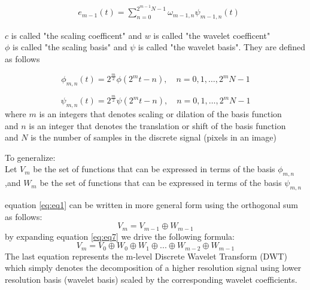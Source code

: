 \documentclass{svproc}
\begin{document}
  \begin{equation}
    \begin{aligned}
       & e_{m-1}(t)=\sum_{n=0}^{2^{m-1} N-1} \omega_{{m-1}, n} \psi_{{m-1}, n}(t)
    \end{aligned}
    \label{eq:eq4}
  \end{equation}

  \noindent
  $c$ is called "the scaling coefficent" and $w$ is called "the wavelet coefficent"\\
  $\phi$ is called "the scaling basis" and $\psi$ is called "the wavelet basis". They are defined as follows

  \begin{equation}
    \phi_{m, n}(t)=2^{\frac{m}{2}} \phi\left(2^m t-n\right), \quad n=0,1, \ldots, 2^m N-1
    \label{eq:eq5}
    \end{equation}

    \begin{equation}
      \psi_{m, n}(t)=2^{\frac{m}{2}} \psi\left(2^m t-n\right), \quad n=0,1, \ldots, 2^m N-1
      \label{eq:eq6}
      \end{equation}
  where $m$ is an integers that denotes scaling or dilation of the basis function\\
  and $n$ is an integer that denotes the translation or shift of the basis function\\
  and $N$ is the number of samples in the discrete signal (pixels in an image)

  \noindent
To generalize:\\ 
Let $V_m$ be the set of functions that can be expressed in terms of the basis $\phi_{m,n}$\\
,and $W_m$ be the set of functions that can be expressed in terms of the basis $\psi_{m,n}$

\noindent
equation \ref{eq:eq1} can be written in more general form using the orthogonal sum as follows:\\
\begin{equation}
  V_m=V_{m-1} \oplus W_{m-1}
  \label{eq:eq7}
\end{equation}
\noindent
by expanding equation \ref{eq:eq7} we drive the following formula:
\begin{equation}
  V_m=V_0\oplus W_0\oplus W_1\oplus ... \oplus W_{m-2}\oplus W_{m-1}
  \label{eq:eq8}
\end{equation}
\noindent
The last equation represents the m-level Discrete Wavelet Transform (DWT)
which simply denotes the decomposition of a higher resolution signal using lower resolution basis (wavelet basis)
scaled by the corresponding wavelet coefficients.
\end{document}
